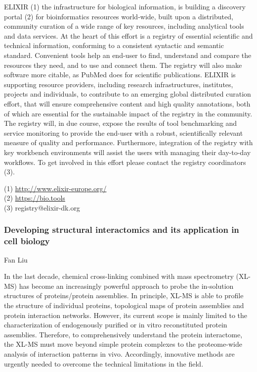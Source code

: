 ELIXIR (1) the infrastructure for biological information, is building a
discovery portal (2) for bioinformatics resources world-wide, built upon a
distributed, community curation of a wide range of key resources, including
analytical tools and data services. At the heart of this effort is a registry of
essential scientific and technical information, conforming to a consistent
syntactic and semantic standard. Convenient tools help an end-user to find,
understand and compare the resources they need, and to use and connect them.
The registry will also make software more citable, as PubMed does for scientific
publications. ELIXIR is supporting resource providers, including research
infrastructures, institutes, projects and individuals, to contribute to an
emerging global distributed curation effort, that will ensure comprehensive
content and high quality annotations, both of which are essential for the
sustainable impact of the registry in the community. The registry will, in due
course, expose the results of tool benchmarking and service monitoring to
provide the end-user with a robust, scientifically relevant measure of quality
and performance. Furthermore, integration of the registry with key workbench
environments will assist the users with managing their day-to-day workflows.
To get involved in this effort please contact the registry coordinators (3).

\noindent
(1) \url{http://www.elixir-europe.org/}\\
(2) \url{https://bio.tools}\\
(3) registry@elixir-dk.org


\subsubsection*{\color{eubicRed} Developing structural interactomics and its application in cell biology}
{\color{eubicGray}Fan Liu}

In the last decade, chemical cross-linking combined with mass spectrometry
(XL-MS) has become an increasingly powerful approach to probe the in-solution
structures of proteins/protein assemblies. In principle, XL-MS is able to
profile the structure of individual proteins, topological maps of protein
assemblies and protein interaction networks. However, its current scope is
mainly limited to the characterization of endogenously purified or in vitro
reconstituted protein assemblies. Therefore, to comprehensively understand the
protein interactome, the XL-MS must move beyond simple protein complexes to the
proteome-wide analysis of interaction patterns in vivo. Accordingly, innovative
methods are urgently needed to overcome the technical limitations in the field.


